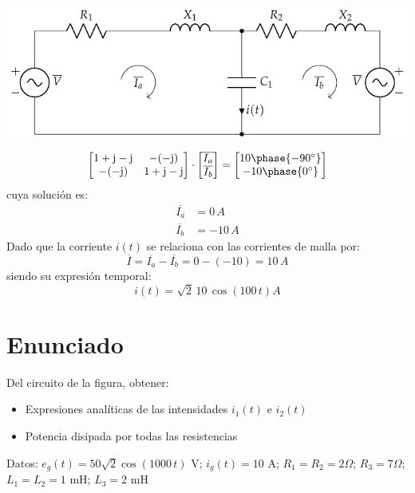 \begin{center}
  \includegraphics{figuras/BT2_13_mod.pdf}
\end{center}

\begin{equation*}
  \begin{bmatrix}
    1+\mathrm{j}-\mathrm{j} & -(-\mathrm{j})\\
    -(-\mathrm{j}) & 1+\mathrm{j}-\mathrm{j}
  \end{bmatrix}
  \cdot
  \begin{bmatrix}
    \overline{I_a}\\
    \overline{I_b}
  \end{bmatrix}
  =
  \begin{bmatrix}
    10\phase{-90^\circ}\\
    -10\phase{0^\circ}
  \end{bmatrix}
\end{equation*}
cuya solución es:
\begin{align*}
  \overline{I_a}&=0\,A\\
  \overline{I_b}&=-10\,A
\end{align*}
Dado que la corriente $i(t)$ se relaciona con las corrientes de malla
por:
\begin{equation*}
  \overline{I}=\overline{I_a}-\overline{I_b}=0-(-10)=10\,A
\end{equation*}
siendo su expresión temporal:
\begin{equation*}
  i(t)=\sqrt{2}\,10\,\cos(100\,t) A
\end{equation*}



\section{Enunciado}
Del circuito de la figura, obtener:
\begin{itemize}
\item Expresiones analíticas de las intensidades $i_1(t)$ e $i_2(t)$
\item Potencia disipada por todas las resistencias
\end{itemize}
Datos: $e_g(t)=50\sqrt{2} \cos(1000\,t)$ V; $i_g(t)=10$ A;
$R_1=R_2=2\Omega$; $R_3=7\Omega$; $L_1=L_2=1$ mH; $L_3=2$ mH

